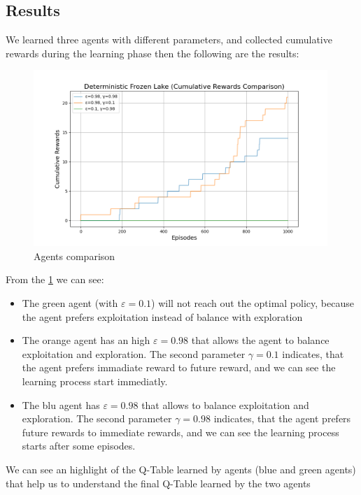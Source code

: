 \subsection{Results}
We learned three agents with different parameters, and collected cumulative rewards during the learning phase then the following are the results:
\begin{figure}[h]
    \centering
    \includegraphics[width=0.99\textwidth]{images/cumulative_rewards_deterministic_comparison.png}
    \caption{Agents comparison}
    \label{fig:cumulative_rewards_deterministic_comparison}
\end{figure}
From the \ref{fig:cumulative_rewards_deterministic_comparison} we can see:
\begin{itemize}
    \item The green agent (with $\varepsilon = 0.1$) will not reach out the optimal policy, because the agent prefers exploitation instead of balance with exploration
    \item The orange agent has an high $\varepsilon = 0.98$ that allows the agent to balance exploitation and exploration. The second parameter $\gamma=0.1$ indicates, that the agent prefers immadiate reward to future reward, and we can see the learning process start immediatly.
    \item The blu agent has $\varepsilon = 0.98$ that allows to balance exploitation and exploration. The second parameter $\gamma=0.98$ indicates, that the agent prefers future rewards to immediate rewards, and we can see the learning process starts after some episodes.
\end{itemize}
We can see an highlight of the Q-Table learned by agents (blue and green agents) that help us to understand the final Q-Table learned by the two agents

